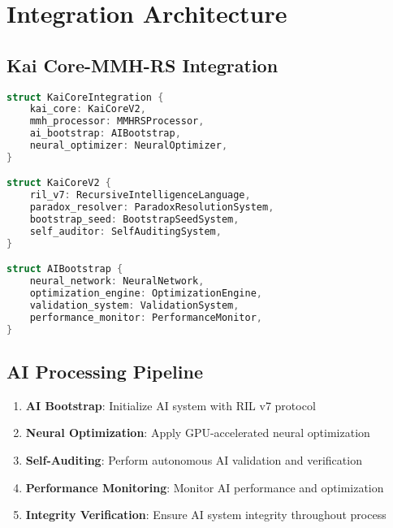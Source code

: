 \documentclass[12pt,a4paper]{article}
\begin{document}
\section{Integration Architecture}

\subsection{Kai Core-MMH-RS Integration}
\begin{lstlisting}[language=Rust, caption=Kai Core Integration Architecture]
struct KaiCoreIntegration {
    kai_core: KaiCoreV2,
    mmh_processor: MMHRSProcessor,
    ai_bootstrap: AIBootstrap,
    neural_optimizer: NeuralOptimizer,
}

struct KaiCoreV2 {
    ril_v7: RecursiveIntelligenceLanguage,
    paradox_resolver: ParadoxResolutionSystem,
    bootstrap_seed: BootstrapSeedSystem,
    self_auditor: SelfAuditingSystem,
}

struct AIBootstrap {
    neural_network: NeuralNetwork,
    optimization_engine: OptimizationEngine,
    validation_system: ValidationSystem,
    performance_monitor: PerformanceMonitor,
}
\end{lstlisting}

\subsection{AI Processing Pipeline}
\begin{enumerate}
    \item \textbf{AI Bootstrap}: Initialize AI system with RIL v7 protocol
    \item \textbf{Neural Optimization}: Apply GPU-accelerated neural optimization
    \item \textbf{Self-Auditing}: Perform autonomous AI validation and verification
    \item \textbf{Performance Monitoring}: Monitor AI performance and optimization
    \item \textbf{Integrity Verification}: Ensure AI system integrity throughout process
\end{enumerate}

\end{document}

